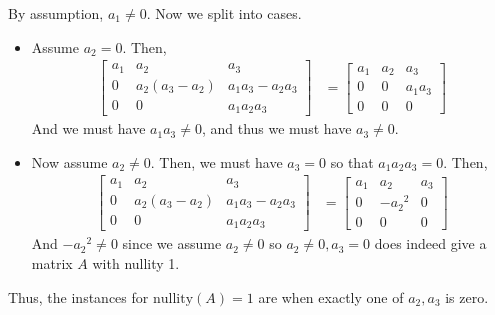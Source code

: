 \documentclass[letterpaper,12pt]{article}
\theoremstyle{definition}
\begin{document}
\begin{enumerate}
\begin{mdframed}
    By assumption, $a_1 \neq 0$. Now we split into cases. \begin{itemize}
        \item Assume $a_2 = 0$. Then, 
        \begin{align*}
            \begin{bmatrix}
         a_1 & a_2 & a_3  \\
          0 & a_2(a_3 - a_2) & a_1a_3 - a_2a_3\\
         0 & 0 & a_1a_2a_3
     \end{bmatrix} &= \begin{bmatrix}
         a_1 & a_2 & a_3  \\
          0 & 0 & a_1a_3\\
         0 & 0 & 0
     \end{bmatrix}
        \end{align*}
        And we must have $a_1a_3 \neq 0$, and thus we must have $a_3 \neq 0$.
     \item Now assume $a_2 \neq 0$. Then, we must have $a_3 = 0$ so that $a_1a_2a_3 = 0$. Then,
      \begin{align*}
            \begin{bmatrix}
         a_1 & a_2 & a_3  \\
          0 & a_2(a_3 - a_2) & a_1a_3 - a_2a_3\\
         0 & 0 & a_1a_2a_3
     \end{bmatrix} &= \begin{bmatrix}
         a_1 & a_2 & a_3  \\
          0 & -{a_2}^2 & 0\\
         0 & 0 & 0
     \end{bmatrix}
        \end{align*}
        And $ -{a_2}^2 \neq 0$ since we assume $a_2 \neq 0$ so $a_2 \neq 0,a_3 = 0$ does indeed give a matrix $A$ with nullity 1.
    \end{itemize}
    Thus, the instances for $\mathrm{nullity}(A)=1$ are when exactly one of $a_2,a_3$ is zero.
         \end{mdframed}
\end{enumerate}
\newpage
\end{document}
